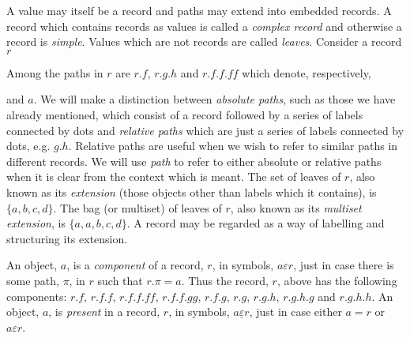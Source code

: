 A value may itself be a record and paths may extend into embedded
records.  A record which contains records as values is called a {\it
  complex record\/} and otherwise a record is {\it simple\/}.  Values which are not records are called {\it
  leaves\/}.  Consider a record $r$ \label{pg:record}
\begin{display}
\end{display}
Among the paths in $r$ are $r.f$, $r.g.h$ and $r.f.f.\mathit{ff}$ which denote,
respectively, 
\begin{display}
\end{display}
\begin{display} 
\end{display}
and $a$.  We will make a distinction between \textit{absolute paths},
such as those we have already mentioned, which consist of a record
followed by a series of labels connected by dots and \textit{relative
  paths} which are just a series of labels connected by dots,
e.g. $g.h$.  Relative paths are useful when we wish to refer to
similar paths in different records.  We will use \textit{path} to
refer to either absolute or relative paths when it is clear from the
context which is meant.  The set of leaves of $r$, also known as its {\it
  extension\/} (those objects other than labels which it contains), is
$\{a,b,c,d\}$.  The bag (or multiset) of leaves of $r$, also known as
its {\it multiset extension\/}, is $\{a,a,b,c,d\}$.  A record may be
regarded as a way of labelling and structuring its extension.

An object, $a$, is a \textit{component} of a record, $r$, in symbols,
$a\varepsilon r$, just in case there is some path, $\pi$, in $r$ such
that $r.\pi=a$.  Thus the record, $r$, above has the following
components: $r.f$, $r.f.f$, $r.f.f.\mathit{ff}$,
$r.f.f.\mathit{gg}$, $r.f.g$, $r.g$, $r.g.h$, $r.g.h.g$ and
$r.g.h.h$. An object, $a$, is \textit{present} in a record, $r$, in
symbols, $a\underline{\varepsilon} r$, just in case either $a=r$ or
$a\varepsilon r$.

